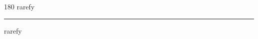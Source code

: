 
\begin{frame}
\begin{center}
\begin{turn}{180}
{\fontsize{2.5cm}{1em}\selectfont rarefy}
\end{turn}
\vspace{1em}\par  
\hrule
\vspace{1em}\par  
{\fontsize{2.5cm}{1em}\selectfont rarefy}
\end{center}
\end{frame}
